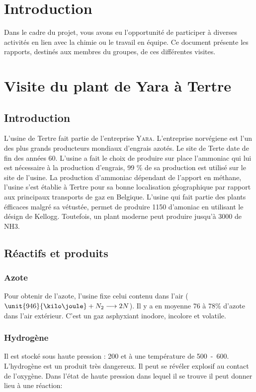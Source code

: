 

\section{Introduction}
Dans le cadre du projet, vous avons eu l'opportunité de
participer à diverses activités en lien avec la chimie ou
le travail en équipe. Ce document présente les rapports,
destinés aux membres du groupes, de ces différentes visites.

\section{Visite du plant de Yara à Tertre}

\subsection{Introduction}
L’usine de Tertre fait partie de l’entreprise \textsc{Yara}. L’entreprise norvégiene est l’un des plus grands producteurs
mondiaux d’engrais azotés. Le site de Terte date de fin des années 60. L’usine a fait le choix de produire sur place 
l’ammoniac qui lui est nécessaire à la production d’engrais, 99 \%  de sa production est utilisé sur le site de l’usine. 
La production d’ammoniac dépendant de l’apport en méthane, l’usine s’est établie à Tertre pour sa bonne localisation 
géographique par rapport aux principaux transports de gaz en Belgique. L'usine qui fait partie des plants éfficaces malgré 
sa vétustée, permet de produire \unit{1150}{\ton\per\dday} d’amoniac en utilisant le désign de Kellogg. 
Toutefois, un plant moderne peut produire jusqu’à \unit{3000}{\ton\per\dday} de NH3.

\subsection{Réactifs et produits}

\subsubsection{Azote}

Pour obtenir de l’azote, l’usine fixe celui contenu dans l’air ($\unit{946}{\kilo\joule} + N_2 \longrightarrow 2N$). 
Il y a en moyenne 76 à 78\% d’azote dans l’air extérieur. C’est un gaz asphyxiant inodore, incolore et volatile. 

\subsubsection{Hydrogène}
Il est stocké sous haute pression : \unit{200}{\bbar} et à une température de \unit{500-600}{\degreecelsius}.
L’hydrogène est un produit très dangereux. Il peut se révéler explosif au contact de l’oxygène. Dans l’état de haute 
pression dans lequel il se trouve il peut donner lieu à une réaction: 

